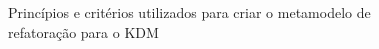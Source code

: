 \begin{figure}[!h]
 \centering
\caption{Princípios e critérios utilizados para criar o metamodelo de refatoração para o KDM}
 \label{fig:processoDOMETAMODELO}
\end{figure}

